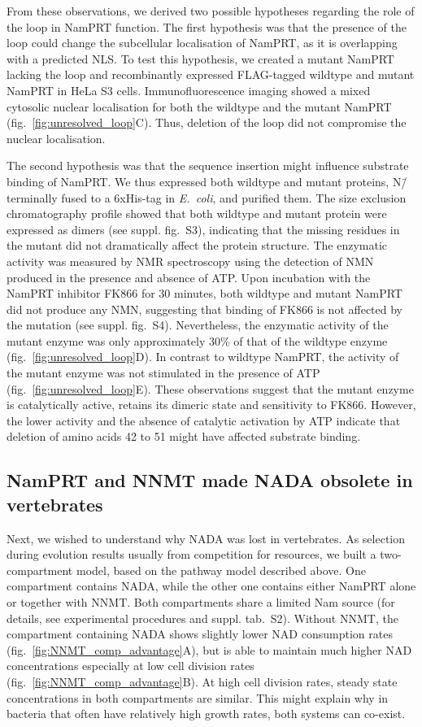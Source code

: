 From these observations, we derived two possible hypotheses regarding the role of the loop in NamPRT function. The first hypothesis was that the presence of the loop could change the subcellular localisation of NamPRT, as it is overlapping with a predicted NLS. To test this hypothesis, we created a mutant NamPRT lacking the loop and recombinantly expressed FLAG-tagged wildtype and mutant NamPRT in HeLa S3 cells. Immunofluorescence imaging showed a mixed cytosolic nuclear localisation for both the wildtype and the mutant NamPRT (fig.~\ref{fig:unresolved_loop}C). Thus, deletion of the loop did not compromise the nuclear localisation.

The second hypothesis was that the sequence insertion might influence substrate binding of NamPRT. We thus expressed both wildtype and mutant proteins, N\=/terminally fused to a 6xHis-tag in \textit{E.~coli}, and purified them. The size exclusion chromatography profile showed that both wildtype and mutant protein were expressed as dimers (see suppl. fig.~S3), indicating that the missing residues in the mutant did not dramatically affect the protein structure. The enzymatic activity was measured by NMR spectroscopy using the detection of NMN produced in the presence and absence of ATP. Upon incubation with the NamPRT inhibitor FK866 \citep{Hasmann2003} for 30 minutes, both wildtype and mutant NamPRT did not produce any NMN, suggesting that binding of FK866 is not affected by the mutation (see suppl. fig.~S4). Nevertheless, the enzymatic activity of the mutant enzyme was only approximately 30\% of that of the wildtype enzyme (fig.~\ref{fig:unresolved_loop}D). In contrast to wildtype NamPRT, the activity of the mutant enzyme was not stimulated in the presence of ATP (fig.~\ref{fig:unresolved_loop}E). These observations suggest that the mutant enzyme is catalytically active, retains its dimeric state and sensitivity to FK866. However, the lower activity and the absence of catalytic activation by ATP indicate that deletion of amino acids 42 to 51 might have affected substrate binding.


\subsection{NamPRT and NNMT made NADA obsolete in vertebrates}

Next, we wished to understand why NADA was lost in vertebrates. As selection during evolution results usually from competition for resources, we built a two-compartment model, based on the pathway model described above. One compartment contains NADA, while the other one contains either NamPRT alone or together with NNMT. Both compartments share a limited Nam source (for details, see experimental procedures and suppl. tab.~S2). Without NNMT, the compartment containing NADA shows slightly lower NAD consumption rates (fig.~\ref{fig:NNMT_comp_advantage}A), but is able to maintain much higher NAD concentrations especially at low cell division rates (fig.~\ref{fig:NNMT_comp_advantage}B). At high cell division rates, steady state concentrations in both compartments are similar. This might explain why in bacteria that often have relatively high growth rates, both systems can co-exist.

